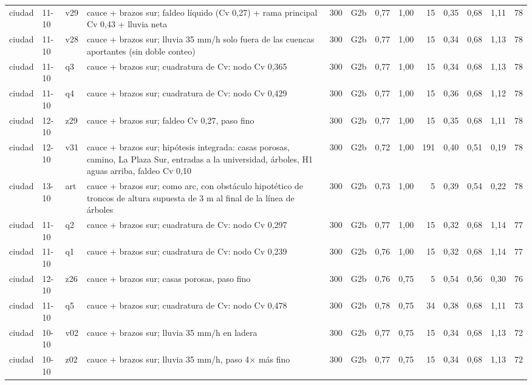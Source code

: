 {\begin{longtable}{lll>{\raggedright\arraybackslash}p{3.3cm}rlrrrrrrr}
ciudad & 11-10 & v29 & cauce + brazos sur; faldeo líquido (Cv 0,27) + rama principal Cv 0,43 + lluvia neta & 300 & G2b & 0{,}77 & 1{,}00 & 15 & 0{,}35 & 0{,}68 & 1{,}11 & 78\\
ciudad & 11-10 & v28 & cauce + brazos sur; lluvia 35 mm/h solo fuera de las cuencas aportantes (sin doble conteo) & 300 & G2b & 0{,}77 & 1{,}00 & 15 & 0{,}34 & 0{,}68 & 1{,}13 & 78\\
ciudad & 11-10 & q3 & cauce + brazos sur; cuadratura de Cv: nodo Cv 0,365 & 300 & G2b & 0{,}77 & 1{,}00 & 15 & 0{,}34 & 0{,}68 & 1{,}13 & 78\\
ciudad & 11-10 & q4 & cauce + brazos sur; cuadratura de Cv: nodo Cv 0,429 & 300 & G2b & 0{,}77 & 1{,}00 & 15 & 0{,}36 & 0{,}68 & 1{,}12 & 78\\
ciudad & 12-10 & z29 & cauce + brazos sur; faldeo Cv 0,27, paso fino & 300 & G2b & 0{,}77 & 1{,}00 & 15 & 0{,}35 & 0{,}68 & 1{,}11 & 78\\
ciudad & 12-10 & v31 & cauce + brazos sur; hipótesis integrada: casas porosas, camino, La Plaza Sur, entradas a la universidad, árboles, H1 aguas arriba, faldeo Cv 0,10 & 300 & G2b & 0{,}72 & 1{,}00 & 191 & 0{,}40 & 0{,}51 & 0{,}19 & 78\\
ciudad & 13-10 & art & cauce + brazos sur; como arc, con obstáculo hipotético de troncos de altura supuesta de 3 m al final de la línea de árboles & 300 & G2b & 0{,}73 & 1{,}00 & 5 & 0{,}39 & 0{,}54 & 0{,}22 & 78\\
ciudad & 11-10 & q2 & cauce + brazos sur; cuadratura de Cv: nodo Cv 0,297 & 300 & G2b & 0{,}77 & 1{,}00 & 15 & 0{,}32 & 0{,}68 & 1{,}14 & 77\\
ciudad & 11-10 & q1 & cauce + brazos sur; cuadratura de Cv: nodo Cv 0,239 & 300 & G2b & 0{,}76 & 1{,}00 & 15 & 0{,}32 & 0{,}68 & 1{,}14 & 77\\
ciudad & 12-10 & z26 & cauce + brazos sur; casas porosas, paso fino & 300 & G2b & 0{,}76 & 0{,}75 & 5 & 0{,}54 & 0{,}56 & 0{,}30 & 76\\
ciudad & 11-10 & q5 & cauce + brazos sur; cuadratura de Cv: nodo Cv 0,478 & 300 & G2b & 0{,}78 & 0{,}75 & 34 & 0{,}38 & 0{,}68 & 1{,}11 & 73\\
ciudad & 10-10 & v02 & cauce + brazos sur; lluvia 35 mm/h en ladera & 300 & G2b & 0{,}77 & 0{,}75 & 15 & 0{,}34 & 0{,}68 & 1{,}13 & 72\\
ciudad & 10-10 & z02 & cauce + brazos sur; lluvia 35 mm/h, paso 4× más fino & 300 & G2b & 0{,}77 & 0{,}75 & 15 & 0{,}34 & 0{,}68 & 1{,}13 & 72\\

\end{longtable}}

